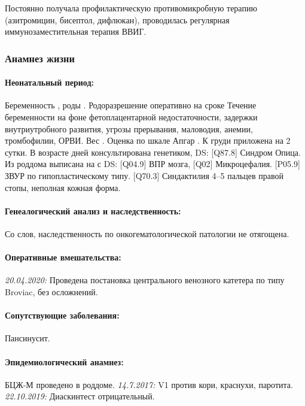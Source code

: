 \documentclass[a4paper,14pt]{extarticle}
\newcommand{\gramm}{г}
\newcommand{\weeks}{нед.}
\newcommand{\pdate}[1]{\emph{#1:} }
\newcommand{\DS}[2]{[#2] #1}
\begin{document}
Постоянно получала профилактическую противомикробную терапию (азитромицин, бисептол, дифлюкан), проводилась регулярная иммунозаместительная терапия ВВИГ.

\subsubsection*{Анамнез жизни}

\paragraph{Неонатальный период:} Беременность , роды . Родоразрешение оперативно на сроке \numprint[\weeks]{38} Течение беременности на фоне фетоплацентарной недостаточности, задержки внутриутробного развития, угрозы прерывания, маловодия, анемии, тромбофилии, ОРВИ. Вес \numprint[\gramm]{2600}. Оценка по шкале Апгар . К груди приложена на 2 сутки. В возрасте  дней консультирована генетиком, DS: \DS{Синдром Опица}{Q87.8}. Из роддома выписана на  с DS: \DS{ВПР мозга}{Q04.9}, \DS{Микроцефалия}{Q02}. \DS{ЗВУР по гипопластическому типу}{P05.9}. \DS{Синдактилия 4--5 пальцев правой стопы, неполная кожная форма}{Q70.3}.

\paragraph{Генеалогический анализ и наследственность:} Со слов, наследственность по онкогематологической патологии не отягощена. 

\paragraph{Оперативные вмешательства:} \pdate{20.04.2020} Проведена постановка центрального венозного катетера по типу Broviac, без осложнений. 

\paragraph{Сопутствующие заболевания:} Пансинусит.

\paragraph{Эпидемиологический анамнез:} БЦЖ-М проведено в роддоме. \pdate{14.7.2017} V1 против кори, краснухи, паротита. \pdate{22.10.2019} Диаскинтест отрицательный. 
\end{document}
